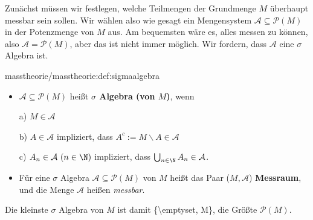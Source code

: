 \par
Zunächst müssen wir festlegen, welche Teilmengen der Grundmenge \(M\) überhaupt messbar sein sollen. Wir wählen also wie gesagt ein Mengensystem \(\mathcal{A} \subseteq \mathcal{P}(M)\) in der Potenzmenge von \(M\) aus.
Am bequemsten wäre es, alles messen zu können, also \(\mathcal{A} = \mathcal{P}(M)\), aber das ist nicht immer möglich. Wir fordern, dass \(\mathcal{A}\) eine \(\sigma\) Algebra ist.
\begin{definition}{}{masstheorie/masstheorie:def:sigmaalgebra}


\begin{itemize}
\item {} 
\par
\(\mathcal{A} \subseteq \mathcal{P}(M)\) heißt \textbf{\(\sigma\) Algebra (von \(M\))}, wenn

\par
a) \(M\in \mathcal{A}\)

\par
b) \(A\in \mathcal{A}\) impliziert, dass \(A^c:=M\backslash A\in \mathcal{A}\)

\par
c) \(A_n\in \mathcal{A}\ (n\in\N)\) impliziert, dass \(\bigcup_{n\in \N} A_n\in \mathcal{A}\).

\item {} 
\par
Für eine \(\sigma\) Algebra \(\mathcal{A} \subseteq \mathcal{P}(M)\) von \(M\) heißt das Paar (\(M,\mathcal{A}\)) \textbf{Messraum}, und die Menge \(\mathcal{A}\) heißen \emph{messbar}.

\end{itemize}
\end{definition}

\par
Die kleinste \(\sigma\) Algebra von \(M\) ist damit \{\textbackslash{}emptyset, M\}, die Größte \(\mathcal{P}(M)\).

